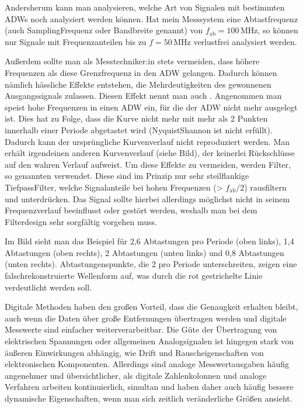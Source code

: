 \documentclass[letterpaper,10pt,english]{jupyterBook}
\begin{document}
\sphinxAtStartPar
Andersherum kann man analysieren, welche Art von Signalen mit bestimmten ADWs noch analysiert werden können. Hat mein Messsystem eine Abtastfrequenz (auch Sampling\sphinxhyphen{}Frequenz oder Bandbreite genannt) von \(f_\mathrm{ab} = 100\,\mathrm{MHz}\), so können nur Signale mit Frequenzanteilen bis zu \(f = 50\,\mathrm{MHz}\) verlustfrei analysiert werden.

\sphinxAtStartPar
Außerdem sollte man als Messtechniker:in stets vermeiden, dass höhere Frequenzen als diese Grenzfrequenz in den ADW gelangen.
Dadurch können nämlich hässliche Effekte entstehen, die Mehrdeutigkeiten des gewonnenen Ausgangssignals zulassen. Diesen Effekt nennt man auch . Angenommen man speist hohe Frequenzen in einen ADW ein, für die der ADW nicht mehr ausgelegt ist. Dies hat zu Folge, dass die Kurve nicht mehr mit mehr als 2 Punkten innerhalb einer Periode abgetastet wird (Nyquist\sphinxhyphen{}Shannon ist nicht erfüllt). Dadurch kann der ursprüngliche Kurvenverlauf nicht reproduziert werden. Man erhält irgendeinen anderen Kurvenverlauf (siehe Bild), der keinerlei Rückschlüsse auf den wahren Verlauf aufweist.
Um diese Effekte zu vermeiden, werden Filter, so genannten  verwendet. Diese sind im Prinzip nur sehr steilflankige Tiefpass\sphinxhyphen{}Filter, welche Signalanteile bei hohen Frequenzen (> \(f_\mathrm{ab}/2\)) rausfiltern und unterdrücken.
Das Signal sollte hierbei allerdings möglichst nicht in seinem Frequenzverlauf beeinflusst oder gestört werden, weshalb man bei dem Filterdesign sehr sorgfältig vorgehen muss.

\sphinxAtStartPar
Im Bild sieht man das Beispiel für 2,6 Abtastungen pro Periode (oben links), 1,4 Abtastungen (oben rechts), 2 Abtastungen (unten links) und 0,8 Abtastungen (unten rechts). Abtastungenspunkte, die 2 pro Periode unterschreiten, zeigen eine falsch\sphinxhyphen{}rekonstruierte Wellenform auf, was durch die rot gestrichelte Linie verdeutlicht werden soll.

\sphinxAtStartPar
{}

\sphinxAtStartPar
Digitale Methoden haben den großen Vorteil, dass die Genaugkeit erhalten bleibt, auch wenn die Daten über große Entfernungen übertragen werden und digitale Messwerte sind einfacher weiterverarbeitbar. Die Güte der Übertragung von elektrischen Spannungen oder allgemeinen Analogsignalen ist hingegen stark von äußeren Einwirkungen abhängig, wie Drift\sphinxhyphen{} und Rauscheigenschaften von elektronischen Komponenten. Allerdings sind analoge Messwertausgaben häufig angenehmer und übersichtlicher, als digitale Zahlenkolonnen und analoge Verfahren arbeiten kontinuierlich, simultan und haben daher auch häufig bessere dynamische Eigenschaften, wenn man sich zeitlich veränderliche Größen ansieht.
\end{document}

